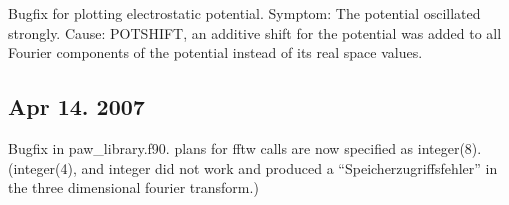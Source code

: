 \documentclass[final,12pt]{article}
\begin{document}
Bugfix for plotting electrostatic potential. Symptom: The potential oscillated strongly.
Cause: POTSHIFT, an additive shift for the potential was added to all Fourier components 
of the potential instead of its real space values.

\subsection{Apr 14. 2007}

Bugfix in paw_library.f90. plans for fftw calls are now specified as integer(8). 
(integer(4), and integer did not work and produced a ``Speicherzugriffsfehler'' in the
 three dimensional fourier transform.)

\newpage


\end{document}
